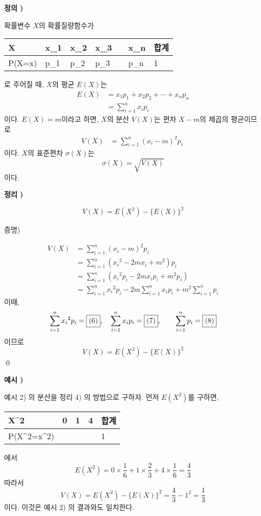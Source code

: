 \documentclass[a4paper]{oblivoir}
\newcounter{num}
\newcommand\defi[1]
{\bigskip\par\noindent\stepcounter{num} \textbf{정의 \thenum) #1}\par\noindent}
\newcommand\theo[1]
{\bigskip\par\noindent\stepcounter{num} \textbf{정리 \thenum) #1}\par\noindent}
\newcommand\exam[1]
{\bigskip\par\noindent\stepcounter{num} \textbf{예시 \thenum) #1}\par\noindent}
\newcommand{\proo}
{\bigskip\textsf{증명)}\par}
\newcommand\summ{\ensuremath{\sum_{i=1}^n}}
\begin{document}
%
\begin{mdframed}
\defi{}
확률변수 \(X\)의 확률질량함수가

\begin{center}
\begin{tabu}to.8\textwidth{X[3$c]|X[$c]X[$c]X[$c]X[$c]X[$c]|X[$c]}
\hline
X		&x_1	&x_2	&x_3	&\cdots		&x_n	&합계\\\hline
P(X=x)	&p_1	&p_2	&p_3	&\cdots		&p_n	&1\\\hline
\end{tabu}
\end{center}
로 주어질 때, \(X\)의 평균 \(E(X)\)는
\begin{align*}
E(X)
&=x_1p_1+x_2p_2+\cdots+x_np_n\\
&=\summ x_ip_i\
\end{align*}
이다.
\(E(X)=m\)이라고 하면,
\(X\)의 분산 \(V(X)\)는 편차 \(X-m\)의 제곱의 평균이므로
\begin{align*}
V(X)
&=\summ(x_i-m)^2p_i\
\end{align*}
이다.
\(X\)의 표준편차 \(\sigma(X)\)는
\[\sigma(X)=\sqrt{V(X)}\]
이다.
\end{mdframed}

%
\begin{mdframed}
\theo{}\label{var}
\[V(X)=E(X^2)-\{E(X)\}^2\]
\end{mdframed}

%
\proo{}
\begin{align*}
V(X)
&=\summ(x_i-m)^2p_i\\
&=\summ({x_i}^2-2mx_i+m^2)p_i\\
&=\summ({x_i}^2p_i-2mx_ip_i+m^2p_i)\\
&=\summ{x_i}^2p_i-2m\summ x_ip_i+m^2\summ p_i
\end{align*}
이때,
\[\summ{x_i}^2p_i=\fbox{(6)},\quad \summ x_ip_i=\fbox{(7)},\qquad \summ p_i=\fbox{(8)}\]
이므로
\[V(X)=E(X^2)-\{E(X)\}^2\]
\qed

%
\exam{}
예시 2)%
의 분산을 정리 4)%
의 방법으로 구하자.
먼저 \(E(X^2)\)를 구하면,
\begin{center}\centering
\begin{tabu}to.8\textwidth{X[2$c]|X[$c]X[$c]X[$c]|X[$c]}
\hline
X^2			&0			&1			&4			&합계\\\hline
P(X^2=x^2)	&	&	&	&1\\\hline
\end{tabu}
\end{center}
에서
\[E(X^2)=0\times\frac16+1\times\frac23+4\times\frac16=\frac43\]
따라서
\[V(X)=E(X^2)-\{E(X)\}^2=\frac43-1^2=\frac13\]
이다. 이것은 예시 2)%
의 결과와도 일치한다.
\end{document}
